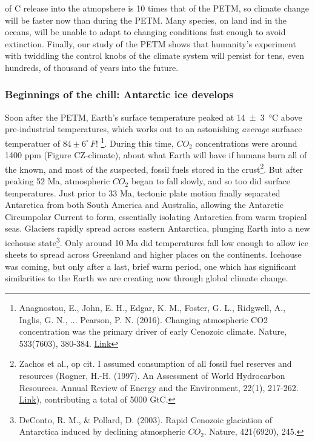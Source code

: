 of C release into the atmopshere is 10 times that of the PETM, so climate change will be faster now than during the PETM. Many species, on land ind in the oceans, will be unable to adapt to changing conditions fast enough to avoid extinction. Finally, our study of the PETM shows that humanity's experiment with twiddling the control knobs of the climate system will persist for tens, even hundreds, of thousand of years into the future.  

\subsubsection{Beginnings of the chill: Antarctic ice develops}
Soon after the PETM, Earth's surface temperature peaked at \SI{14(3)}{\celsius} above pre-industrial temperatures, which works out to an astonishing \emph{average} surfaace temperatuer of $84\pm 6 ^\circ\,F$! \footnote{Anagnostou, E., John, E. H., Edgar, K. M., Foster, G. L., Ridgwell, A., Inglis, G. N., ... Pearson, P. N. (2016). Changing atmospheric CO2 concentration was the primary driver of early Cenozoic climate. Nature, 533(7603), 380-384. \href{https://doi.org/10.1038/nature17423}{Link}}. During this time, $CO_2$ concentrations were around 1400 ppm (Figure CZ-climate), about what Earth will have if humans burn all of the known, and most of the suspected, fossil fuels stored in the crust\footnote{Zachos et al., op cit. I assumed consumption of all fossil fuel reserves and resources (Rogner, H.-H. (1997). An Assessment of World Hydrocarbon Resources. Annual Review of Energy and the Environment, 22(1), 217-262. \href{https://doi.org/10.1146/annurev.energy.22.1.217}{Link}), contributing a total of 5000 GtC.}. But after peaking 52 Ma, atmospheric $CO_2$ began to fall slowly, and so too did surface temperatures. Just prior to 33 Ma, tectonic plate motion finally separated Antarctica from both South America and Australia, allowing the Antarctic Circumpolar Current to form, essentially isolating Antarctica from warm tropical seas. Glaciers rapidly spread across eastern Antarctica, plunging Earth into a new icehouse state\footnote{DeConto, R. M., \& Pollard, D. (2003). Rapid Cenozoic glaciation of Antarctica induced by declining atmospheric $CO_2$. Nature, 421(6920), 245.}. Only around 10 Ma did temperatures fall low enough to allow ice sheets to spread across Greenland and higher places on the continents. Icehouse was coming, but only after a last, brief warm period, one which has significant similarities to the Earth we are creating now through global climate change.\\ 
